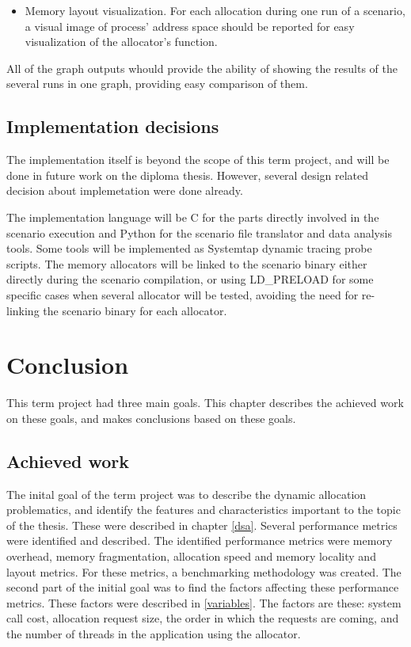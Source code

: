 \begin{itemize}
\item Memory layout visualization. For each allocation during one run of a scenario, a visual image of process' address space should be reported for easy visualization of the allocator's function.  
\end{itemize}

All of the graph outputs whould provide the ability of showing the results of the several runs in one graph, providing easy comparison of them.

\section{Implementation decisions}
The implementation itself is beyond the scope of this term project, and will be done in future work on the diploma thesis. However, several design related decision about implemetation were done already.

The implementation language will be C for the parts directly involved in the scenario execution and Python for the scenario file translator and data analysis tools. Some tools will be implemented as Systemtap dynamic tracing probe scripts. The memory allocators will be linked to the scenario binary either directly during the scenario compilation, or using LD\_PRELOAD for some specific cases when several allocator will be tested, avoiding the need for re-linking the scenario binary for each allocator. 

\chapter{Conclusion}

This term project had three main goals. This chapter describes the achieved work on these goals, and makes conclusions based on these goals.

\section{Achieved work}

The inital goal of the term project was to describe the dynamic allocation problematics, and identify the features and characteristics important to the topic of the thesis. These were described in chapter \ref{dsa}. Several performance metrics were identified and described. The identified performance metrics were memory overhead, memory fragmentation, allocation speed and memory locality and layout metrics. For these metrics, a benchmarking methodology was created. The second part of the initial goal was to find the factors affecting these performance metrics. These factors were described in \ref{variables}. The factors are these: system call cost, allocation request size, the order in which the requests are coming, and the number of threads in the application using the allocator.

